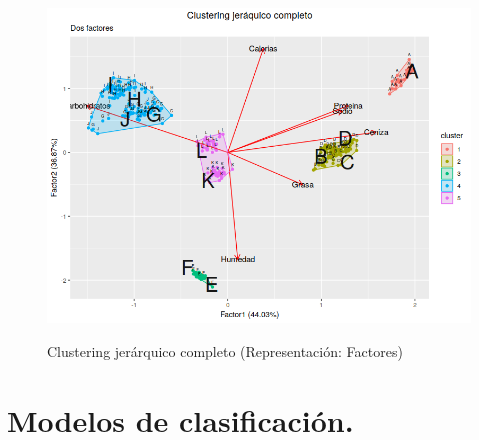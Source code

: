 \documentclass[pdf]{beamer}
\begin{document}
\begin{frame}
\begin{figure}[h]
\centering
	\includegraphics[scale=.35]{images/clusterFactores.png} 
	\label{i_cluster_Factores}
	\caption{Clustering jerárquico completo (Representación: Factores)}
\end{figure}
\end{frame}


\section{Modelos de clasificación.}
\end{document}
